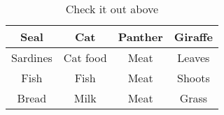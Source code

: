 \begin{table}[htbp]
\centering
\begin{tabular}{||c c c c||} 
 \hline
 Seal & Cat & Panther & Giraffe \\ 
 \hline\hline
 Sardines & Cat food & Meat & Leaves \\ 
 \hline
 Fish & Fish & Meat & Shoots \\
 \hline
 Bread & Milk & Meat & Grass \\
 \hline
\end{tabular}
\caption{Check it out above}
\label{tab:zwierzeta}
\end{table}
